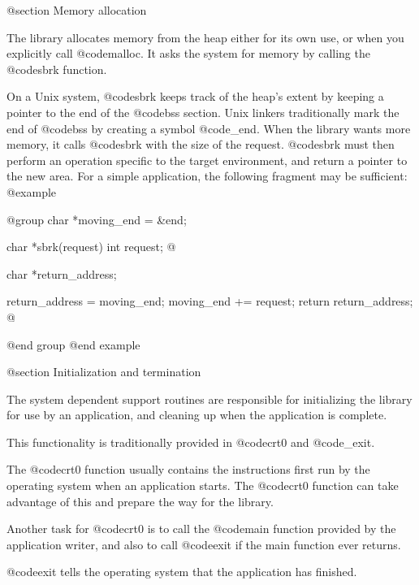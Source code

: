 @section Memory allocation

The library allocates memory from the heap either for its own use, or when
you explicitly call @code{malloc}.  It asks the system for
memory by calling the @code{sbrk} function.  

On a Unix system, @code{sbrk} keeps track of the heap's extent by keeping a
pointer to the end of the @code{bss} section.  Unix linkers
traditionally mark the end of @code{bss} by creating a symbol
@code{_end}.  When the library wants more memory, it calls
@code{sbrk} with the size of the request.  @code{sbrk} must then
perform an operation specific to the target environment, and return a pointer
to the new area.  For a simple application, the following fragment may
be sufficient:
@example

@group
char *moving_end = &end;

char *sbrk(request)
int request;
@{
  char *return_address;

  return_address = moving_end;
  moving_end += request;
  return return_address;
@}
@end group
@end example

@section Initialization and termination

The system dependent support routines are responsible for
initializing the library for use by an application, and cleaning up
when the application is complete.

This functionality is traditionally provided in @code{crt0} and
@code{_exit}.  

The @code{crt0} function usually contains the instructions first run
by the operating system when an application starts.  The
@code{crt0} function can take advantage of this and prepare the way
for the library.

Another task for @code{crt0} is to call the @code{main} function
provided by the application writer, and also to call @code{exit} if
the main function ever returns.

@code{exit} tells the operating system that the application has
finished.



